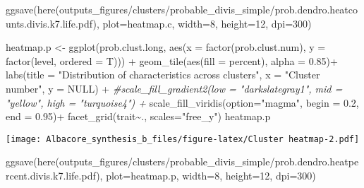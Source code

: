 \documentclass[
]{article}
\newenvironment{Shaded}{\begin{snugshade}}{\end{snugshade}}
\newcommand{\AttributeTok}[1]{\textcolor[rgb]{0.77,0.63,0.00}{#1}}
\newcommand{\CommentTok}[1]{\textcolor[rgb]{0.56,0.35,0.01}{\textit{#1}}}
\newcommand{\ConstantTok}[1]{\textcolor[rgb]{0.00,0.00,0.00}{#1}}
\newcommand{\DecValTok}[1]{\textcolor[rgb]{0.00,0.00,0.81}{#1}}
\newcommand{\FloatTok}[1]{\textcolor[rgb]{0.00,0.00,0.81}{#1}}
\newcommand{\FunctionTok}[1]{\textcolor[rgb]{0.00,0.00,0.00}{#1}}
\newcommand{\NormalTok}[1]{#1}
\newcommand{\OtherTok}[1]{\textcolor[rgb]{0.56,0.35,0.01}{#1}}
\newcommand{\SpecialCharTok}[1]{\textcolor[rgb]{0.00,0.00,0.00}{#1}}
\newcommand{\StringTok}[1]{\textcolor[rgb]{0.31,0.60,0.02}{#1}}
\begin{document}
\begin{Shaded}
\begin{Highlighting}[]
\FunctionTok{ggsave}\NormalTok{(}\FunctionTok{here}\NormalTok{(}\StringTok{\textquotesingle{}outputs\_figures/clusters/probable\_divis\_simple/prob.dendro.heatcounts.divis.k7.life.pdf\textquotesingle{}}\NormalTok{), }\AttributeTok{plot=}\NormalTok{heatmap.c, }\AttributeTok{width=}\DecValTok{8}\NormalTok{, }\AttributeTok{height=}\DecValTok{12}\NormalTok{, }\AttributeTok{dpi=}\DecValTok{300}\NormalTok{)}


\NormalTok{heatmap.p }\OtherTok{\textless{}{-}} \FunctionTok{ggplot}\NormalTok{(prob.clust.long, }\FunctionTok{aes}\NormalTok{(}\AttributeTok{x =} \FunctionTok{factor}\NormalTok{(prob.clust.num), }\AttributeTok{y =} \FunctionTok{factor}\NormalTok{(level, }\AttributeTok{ordered =}\NormalTok{ T))) }\SpecialCharTok{+}
  \FunctionTok{geom\_tile}\NormalTok{(}\FunctionTok{aes}\NormalTok{(}\AttributeTok{fill =}\NormalTok{ percent), }\AttributeTok{alpha =} \FloatTok{0.85}\NormalTok{)}\SpecialCharTok{+}
  \FunctionTok{labs}\NormalTok{(}\AttributeTok{title =} \StringTok{"Distribution of characteristics across clusters"}\NormalTok{, }\AttributeTok{x =} \StringTok{"Cluster number"}\NormalTok{, }\AttributeTok{y =} \ConstantTok{NULL}\NormalTok{) }\SpecialCharTok{+}
  \CommentTok{\#scale\_fill\_gradient2(low = "darkslategray1", mid = "yellow", high = "turquoise4") +}
  \FunctionTok{scale\_fill\_viridis}\NormalTok{(}\AttributeTok{option=}\StringTok{"magma"}\NormalTok{, }\AttributeTok{begin =} \FloatTok{0.2}\NormalTok{, }\AttributeTok{end =} \FloatTok{0.95}\NormalTok{)}\SpecialCharTok{+}
  \FunctionTok{facet\_grid}\NormalTok{(trait}\SpecialCharTok{\textasciitilde{}}\NormalTok{., }\AttributeTok{scales=}\StringTok{"free\_y"}\NormalTok{)}
\NormalTok{heatmap.p}
\end{Highlighting}
\end{Shaded}

\texttt{[image: Albacore\_synthesis\_b\_files/figure-latex/Cluster heatmap-2.pdf]}

\begin{Shaded}
\begin{Highlighting}[]
\FunctionTok{ggsave}\NormalTok{(}\FunctionTok{here}\NormalTok{(}\StringTok{\textquotesingle{}outputs\_figures/clusters/probable\_divis\_simple/prob.dendro.heatpercent.divis.k7.life.pdf\textquotesingle{}}\NormalTok{), }\AttributeTok{plot=}\NormalTok{heatmap.p, }\AttributeTok{width=}\DecValTok{8}\NormalTok{, }\AttributeTok{height=}\DecValTok{12}\NormalTok{, }\AttributeTok{dpi=}\DecValTok{300}\NormalTok{)}
\end{Highlighting}
\end{Shaded}
\end{document}

